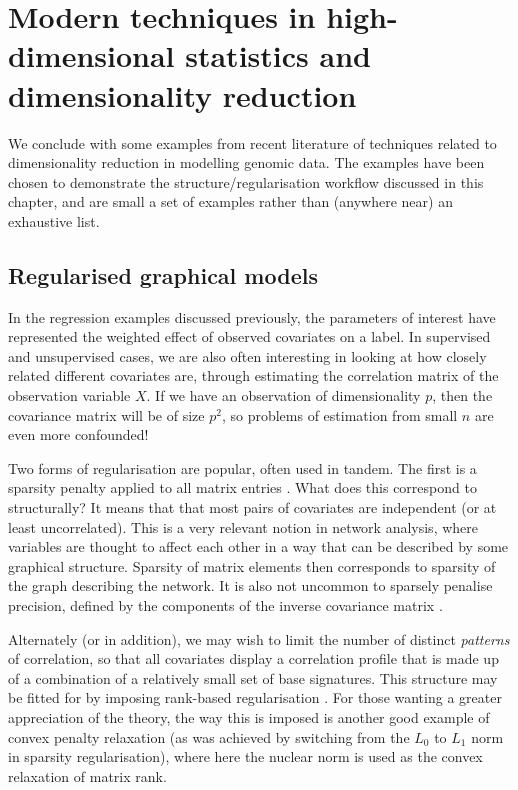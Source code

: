 \documentclass[thesis.tex]{subfiles}
\begin{document}
\section{Modern techniques in high-dimensional statistics and dimensionality reduction}
We conclude with some examples from recent literature of techniques related to dimensionality reduction in modelling genomic data. The examples have been chosen to  demonstrate the structure/regularisation workflow discussed in this chapter, and are small a set of examples rather than (anywhere near) an exhaustive list.

\subsection{Regularised graphical models}
In the regression examples discussed previously, the parameters of interest have represented the weighted effect of observed covariates on a label. In supervised and unsupervised cases, we are also often interesting in looking at how closely related different covariates are, through estimating the correlation matrix of the observation variable $X$. If we have an observation of dimensionality $p$, then the covariance matrix will be of size $p^2$, so problems of estimation from small $n$ are even more confounded! 

Two forms of regularisation are popular, often used in tandem. The first is a sparsity penalty applied to all matrix entries \citep{witten_covariance-regularized_2009}. What does this correspond to structurally? It means that that most pairs of covariates are independent (or at least uncorrelated). This is a very relevant notion in network analysis, where variables are thought to affect each other in a way that can be described by some graphical structure. Sparsity of matrix elements then corresponds to sparsity of the graph describing the network. It is also not uncommon to sparsely penalise precision, defined by the components of the inverse covariance matrix \citep{xia_positive-definite_2017}. 

Alternately (or in addition), we may wish to limit the number of distinct \textit{patterns} of correlation, so that all covariates display a correlation profile that is made up of a combination of a relatively small set of base signatures. This structure may be fitted for by imposing rank-based regularisation \citep{ye_low-rank_2013, hu_low_2021}. For those wanting a greater appreciation of the theory, the way this is imposed is another good example of convex penalty relaxation (as was achieved by switching from the $L_0$ to $L_1$ norm in sparsity regularisation), where here the nuclear norm is used as the convex relaxation of matrix rank.  
\end{document}
